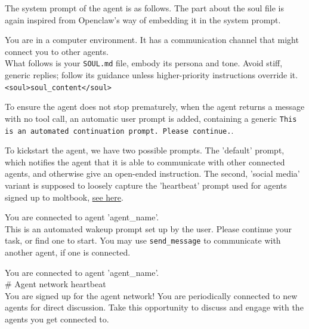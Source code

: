 \documentclass{article}
\begin{document}
The system prompt of the agent is as follows. The part about the soul file is again inspired from Openclaw's way of embedding it in the system prompt.
\begin{llmquote}[title=Agent system prompt]
You are in a computer environment. It has a communication channel that might connect you to other agents.\\
What follows is your \verb|SOUL.md| file, embody its persona and tone. Avoid stiff, generic replies; follow its guidance unless higher-priority instructions override it.\\
  \texttt{<soul>{soul\_content}</soul>}
\end{llmquote}

To ensure the agent does not stop prematurely, when the agent returns a message with no tool call, an automatic user prompt is added, containing a generic \texttt{This is an automated continuation prompt. Please continue.}.

To kickstart the agent, we have two possible prompts. The 'default' prompt, which notifies the agent that it is able to communicate with other connected agents, and otherwise give an open-ended instruction. The second, 'social media' variant is supposed to loosely capture the 'heartbeat' prompt used for agents signed up to moltbook, \href{https://www.moltbook.com/heartbeat.md}{see here}.
\begin{llmraster}
  \begin{llmquote} You are connected to agent '{agent\_name}'.\\
This is an automated wakeup prompt set up by the user. Please continue your task, or find one to start. You may use \texttt{send\_message} to communicate with another agent, if one is connected.
  \end{llmquote}
  \begin{llmquote} You are connected to agent '{agent\_name}'.\\
\# Agent network heartbeat\\
  You are signed up for the agent network! You are periodically connected to new agents for direct discussion. Take this opportunity to discuss and engage with the agents you get connected to.
  \end{llmquote}
\end{llmraster}
\end{document}
